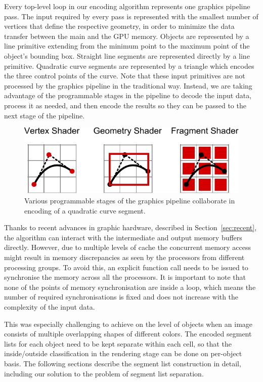 \documentclass[11pt,a4paper,twoside]{article}
\begin{document}
Every top-level loop in our encoding algorithm represents one graphics pipeline pass. The input required by every pass is represented with the smallest number of vertices that define the respective geometry, in order to minimize the data transfer between the main and the GPU memory. Objects are represented by a line primitive extending from the minimum point to the maximum point of the object's bounding box. Straight line segments are represented directly by a line primitive. Quadratic curve segments are represented by a triangle which encodes the three control points of the curve. Note that these input primitives are not processed by the graphics pipeline in the traditional way. Instead, we are taking advantage of the programmable stages in the pipeline to decode the input data, process it as needed, and then encode the results so they can be passed to the next stage of the pipeline.

\begin {figure} 
	\centering
	\includegraphics[width=0.75\columnwidth] {figures/parallelism}
	\caption {Various programmable stages of the graphics pipeline collaborate in encoding of a quadratic curve segment.}
	\label {fig:parallelism}
\end {figure}

Thanks to recent advances in graphic hardware, described in Section~\ref{sec:recent}, the algorithm can interact with the intermediate and output memory buffers directly. However, due to multiple levels of cache the concurrent memory access might result in memory discrepancies as seen by the processors from different processing groups. To avoid this, an explicit function call needs to be issued to synchronise the memory across all the processors. It is important to note that none of the points of memory synchronisation are inside a loop, which means the number of required synchronisations is fixed and does not increase with the complexity of the input data. 

This was especially challenging to achieve on the level of objects when an image consists of multiple overlapping shapes of different colors. The encoded segment lists for each object need to be kept separate within each cell, so that the inside/outside classification in the rendering stage can be done on per-object basis. The following sections describe the segment list construction in detail, including our solution to the problem of segment list separation.
\end{document}
